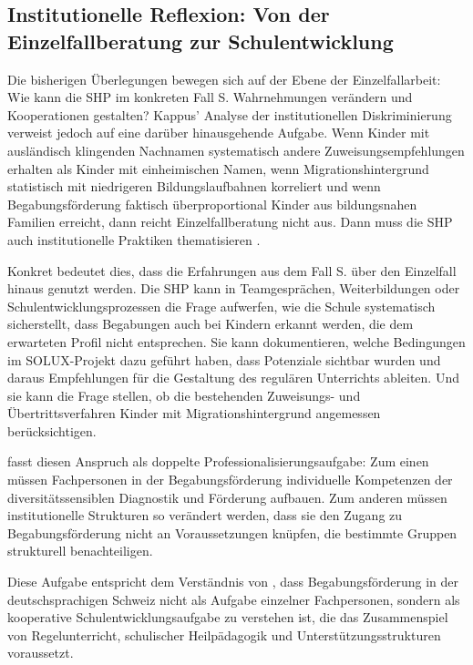 \documentclass[ngerman, a4paper]{article}
\begin{document}
\subsection{Institutionelle Reflexion: Von der Einzelfallberatung zur Schulentwicklung}

Die bisherigen Überlegungen bewegen sich auf der Ebene der Einzelfallarbeit: Wie
kann die SHP im konkreten Fall S. Wahrnehmungen verändern und Kooperationen
gestalten? Kappus' Analyse der institutionellen Diskriminierung verweist jedoch
auf eine darüber hinausgehende Aufgabe. Wenn Kinder mit ausländisch klingenden
Nachnamen systematisch andere Zuweisungsempfehlungen erhalten als Kinder mit
einheimischen Namen, wenn Migrationshintergrund statistisch mit niedrigeren
Bildungslaufbahnen korreliert und wenn Begabungsförderung faktisch
überproportional Kinder aus bildungsnahen Familien erreicht, dann reicht
Einzelfallberatung nicht aus. Dann muss die SHP auch institutionelle Praktiken
thematisieren \parencite[S.\,63--77]{kappus2010migration}.

Konkret bedeutet dies, dass die Erfahrungen aus dem Fall S. über den Einzelfall
hinaus genutzt werden. Die SHP kann in Teamgesprächen, Weiterbildungen oder
Schulentwicklungsprozessen die Frage aufwerfen, wie die Schule systematisch
sicherstellt, dass Begabungen auch bei Kindern erkannt werden, die dem
erwarteten Profil nicht entsprechen. Sie kann dokumentieren, welche Bedingungen
im SOLUX-Projekt dazu geführt haben, dass Potenziale sichtbar wurden und
daraus Empfehlungen für die Gestaltung des regulären Unterrichts ableiten.
Und sie kann die Frage stellen, ob die bestehenden Zuweisungs- und
Übertrittsverfahren Kinder mit Migrationshintergrund angemessen berücksichtigen.

\textcite[S.\,161,\,163\psq]{macha2019gender} fasst diesen Anspruch als doppelte Professionalisierungsaufgabe: Zum einen
müssen Fachpersonen in der Begabungsförderung individuelle Kompetenzen der
diversitätssensiblen Diagnostik und Förderung aufbauen. Zum anderen müssen
institutionelle Strukturen so verändert werden, dass sie den Zugang zu
Begabungsförderung nicht an Voraussetzungen knüpfen, die bestimmte
Gruppen strukturell benachteiligen.

Diese Aufgabe entspricht dem Verständnis von
\textcite[S.\,319--322]{grossenbacher2014integrative}, dass Begabungsförderung
in der deutschsprachigen Schweiz nicht als Aufgabe einzelner Fachpersonen,
sondern als kooperative Schulentwicklungsaufgabe zu verstehen ist, die das
Zusammenspiel von Regelunterricht, schulischer Heilpädagogik und
Unterstützungsstrukturen voraussetzt.
\end{document}
